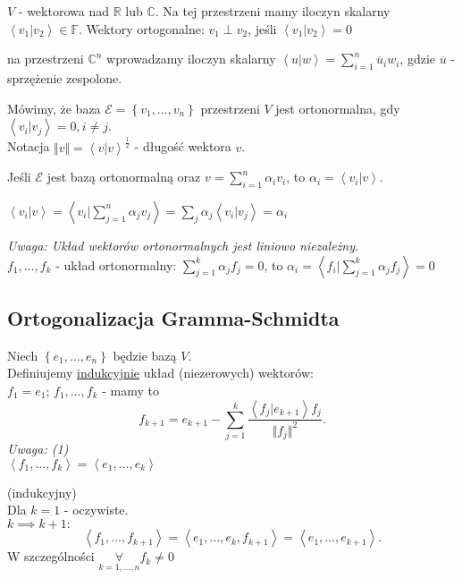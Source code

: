 \documentclass[../main.tex]{subfiles}
\begin{document}
    $V$ - wektorowa nad $\mathbb{R}$ lub $\mathbb{C}$. Na tej przestrzeni mamy iloczyn skalarny $\left< v_1 | v_2 \right> \in \mathbb{F}$. Wektory ortogonalne: $v_1 \perp v_2$, jeśli $\left< v_1 | v_2 \right> = 0$
    \begin{przyklad}
        na przestrzeni $\mathbb{C}^n$ wprowadzamy iloczyn skalarny $\left< u|w \right> = \sum_{i=1}^n \overline{u}_i w_i$, gdzie $\overline{u}$ - sprzężenie zespolone.
    \end{przyklad}
    Mówimy, że baza $\mathcal{E} = \left\{ v_1,\ldots,v_n \right\} $ przestrzeni $V$ jest ortonormalna, gdy $\left< v_i|v_j \right> = 0, i\neq j$.\\
    Notacja $\Vert v \Vert = \left< v|v \right>^{\frac{1}{2}}$ - długość wektora $v$.

    \begin{stw}
        Jeśli $\mathcal{E}$ jest bazą ortonormalną oraz $v = \sum_{i=1}^n \alpha_i v_i$, to $\alpha_i = \left< v_i | v \right>$.
    \end{stw}
    \begin{dowod}
        $\left< v_i | v \right> = \left< v_i | \sum_{j=1}^n \alpha_j v_j \right> = \sum_j \alpha_j \left< v_i | v_j \right> = \alpha_i$
    \end{dowod}
    \textit{Uwaga: Układ wektorów ortonormalnych jest liniowo niezależny.}\\
    $f_1, \ldots, f_k$ - układ ortonormalny: $\sum_{j=1}^k \alpha_j f_j = 0$, to $\alpha_i = \left< f_i | \sum_{j=1}^k \alpha_j f_j \right> = 0$
    \subsection{Ortogonalizacja Gramma-Schmidta}
    Niech $\left\{ e_1,\ldots,e_n \right\} $ będzie bazą $V$.\\
    Definiujemy \underline{indukcyjnie} układ (niezerowych) wektorów:\\
    $f_1 = e_1$; $f_1,\ldots,f_k$ - mamy to \[f_{k+1} = e_{k+1} - \sum_{j=1}^k \frac{\left< f_j | e_{k+1} \right>f_j}{\Vert f_j \Vert ^2}.\]
\textit{Uwaga: (1)}\\
$\left<f_1,\ldots,f_k \right> = \left<e_1,\ldots,e_k \right>$
    \begin{dowod}
        (indukcyjny)\\
        Dla $k=1$ - oczywiste.\\
        $k\implies k+1:$
        \[
            \left<f_1,\ldots,f_{k+1} \right> = \left<e_1,\ldots,e_k,f_{k+1} \right> = \left<e_1,\ldots,e_{k+1} \right>
        .\]
        W szczególności $\underset{k=1,\ldots,n}{\forall} f_k \neq 0$
    \end{dowod}
\end{document}
